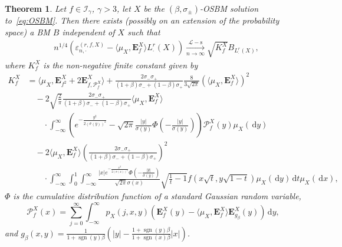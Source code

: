 \documentclass[12pt]{article}
\numberwithin{equation}{section}
\newtheorem{theorem}{Theorem}
\theoremstyle{definition}
\theoremstyle{remark}
\newcommand{\convsl}[1][]{\xrightarrow[#1]{\mathcal{L}-\mathrm{s}}}
\newcommand{\vd}{\,\mathrm{d}}
\newcommand{\Lg}[1]{\mathcal{I}_{#1}}
\newcommand{\bfF}[1]{\mathbf{E}^X_{#1}}
\DeclareMathOperator{\sgn}{sgn}
\begin{document}
\begin{theorem} \label{th:gen:jacod}
Let $f\in \Lg{\gamma}$, $\gamma > 3$, 
let $X$ be the $(\beta,\sigma_\pm)$-OSBM solution to~\eqref{eq:OSBM}.
%
Then there exists (possibly on an extension of the probability space) a BM $B$ independent of $X$ such that
\begin{equation} \label{th:gen:jacod:eq}
\begin{split}
	& n^{1/4} 
	\left(  \varepsilon_{n,\cdot}^{(r,f,X)} -  \langle \mu_X , \bfF{f} \rangle L^r_\cdot(X)\right)
	\convsl[n\to\infty]
\sqrt{K_f^X} B_{L^r_\cdot(X)}, 
\end{split} 
\end{equation}
where $K_f^X$ is the non-negative finite constant given by 
\begin{equation} \label{eq:k:th}
\begin{split}
   K_f^X
	& = \langle \mu_X , \bfF{f^2} + 2 \bfF{f,\mathcal{P}_{f}^X} \rangle  
			+ \frac{ 2 \sigma_- \sigma_+}{(1+\beta)\sigma_-+(1-\beta)\sigma_+} \frac{8}{3 \sqrt{2\pi}} (\langle \mu_X , \bfF{f} \rangle)^2 
			\\
	& \quad - 2 \sqrt{\frac{2}{\pi}} \frac{ 2 \sigma_- \sigma_+}{(1+\beta)\sigma_-+(1-\beta)\sigma_+} \langle \mu_X , \bfF{f} \rangle
			 \\
	& \qquad \cdot \int_{-\infty}^\infty \left( e^{-\frac{y^2}{2(\sigma(y))^2}} -\sqrt{2\pi} \frac{|y|}{\sigma(y)} \Phi\left(-\frac{|y|}{\sigma(y)}\right)\right) \mathcal{P}_{f}^X(y) \mu_X(\!\vd y)
	\\
	& \quad -
	2 \langle \mu_X , \bfF{f} \rangle 
	\left(\frac{ 2 \sigma_- \sigma_+}{(1+\beta)\sigma_-+(1-\beta)\sigma_+}\right)^{\!2}
	\\
	& \qquad \cdot 
\int_{-\infty}^{\infty} \int_0^1 \int_{-\infty}^{\infty} \tfrac{|x| e^{-\frac{x^2}{2(\sigma(x))^2}} \Phi\left(-\frac{|y|}{\sigma(y)}\right)}{\sqrt{2\pi}\sigma(x)}  \sqrt{\frac{1}t-1} f(x \sqrt{t}, y \sqrt{1-t}) \mu_X(\!\vd y) \vd t \mu_X(\!\vd x),
\end{split}\end{equation}
$\Phi$ is the cumulative distribution function of a standard Gaussian random variable, 
\begin{equation} \label{eq:cQ:limit}
	\mathcal{P}_{f}^X(x) = \sum_{j=0}^{\infty } \int_{-\infty}^{\infty} p_X(j,x, y)\left(\bfF{f}(y)- \langle \mu_X , \bfF{f} \rangle \bfF{g_\beta}(y)\right) \vd y,
\end{equation}
and 
$
	g_\beta(x,y) = \frac{1}{1+\sgn(y)\beta}\left(|y| - \frac{1+\sgn(y)\beta}{1+\sgn(x)\beta}|x|\right)
$.
\end{theorem}
\end{document}
